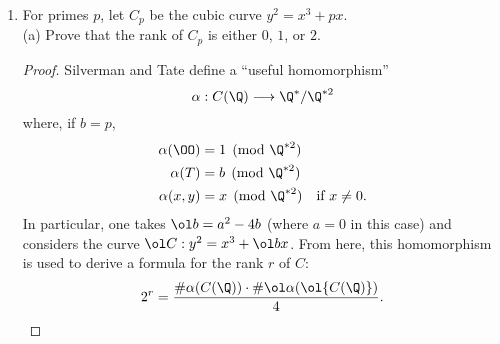 \documentclass[11pt, oneside]{article}
\begin{document}
\begin{enumerate}
%
\item For primes $p$, let $C_p$ be the cubic curve $y^2=x^3+px$.\\
(a) Prove that the rank of $C_p$ is either $0$, $1$, or $2$.
\begin{proof}
Silverman and Tate define a ``useful homomorphism''
$$
\alpha : C(\Q) \longrightarrow \Q^* /\Q^{*2} 
$$
where, if $b=p$,
\begin{align*}
\alpha(\OO) &= 1 \pmod{\Q^{*2}}\\
\alpha(T) &= b \pmod{\Q^{*2}}\\
\alpha(x,y) &= x \pmod{\Q^{*2}} \quad\textrm{if }x\neq 0.
\end{align*}
In particular, one takes $\ol b = a^2 - 4b$ (where $a=0$ in this case) and considers the curve $\ol C : y^2 = x^3 + \ol bx$. From here, this homomorphism is used to derive a formula for the rank $r$ of $C$:
$$
2^r = \frac{\#\alpha(C(\Q)) \cdot\#\ol\alpha(\ol {C(\Q)})}{4}.
$$
\end{proof}
\end{enumerate}
\end{document}
